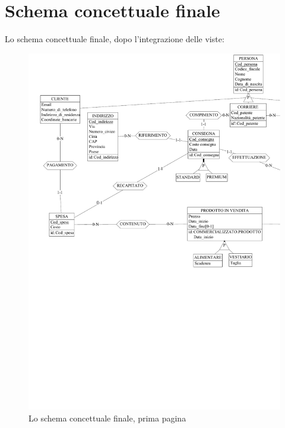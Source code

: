 \documentclass[a4paper,12pt]{report}
\begin{document}
\section{Schema concettuale finale}
Lo schema concettuale finale, dopo l'integrazione delle viste:
\begin{figure}[h]
	\centering{}
	\includegraphics[width=\textwidth]{img/SchemaConcettuale-fin1.pdf}
	\caption{Lo schema concettuale finale, prima pagina}
\end{figure}
\end{document}
